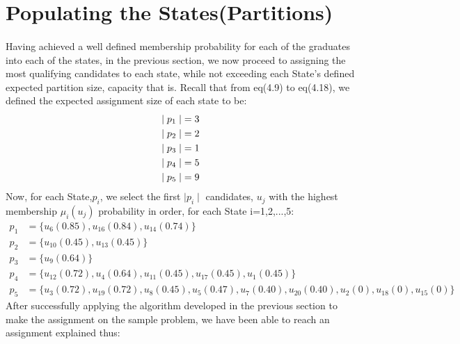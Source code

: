 \documentclass[a4paper,openany]{book}
\begin{document}
		\section{Populating the States(Partitions)}
			\paragraph{}
				Having achieved a well defined membership probability for each of the graduates into each of the states, in the previous section, we now proceed to assigning the most qualifying candidates to each state, while not exceeding each State's defined expected partition size, capacity that is.
				Recall that from eq(4.9) to eq(4.18), we defined the expected assignment size of each state to be:
				\begin{align}
					\mid p_1 \mid &= 3 \notag \\
					\mid p_2 \mid &= 2 \notag \\
					\mid p_3 \mid &= 1 \notag \\
					\mid p_4 \mid &= 5 \notag \\
					\mid p_5 \mid &= 9 \notag
				\end{align}
				Now, for each State,$p_i$, we select the first $\mid p_i \mid$ candidates, $u_j$ with the highest membership $\mu_i(u_j)$ probability in order, for each State i=1,2,...,5:
				\begin{align}
					p_1 &= \{u_6(0.85), u_{16}(0.84), u_{14}(0.74)\}\\
					p_2 &= \{u_{10}(0.45), u_{13}(0.45)\}\\
					p_3 &= \{u_{9}(0.64)\}\\
					p_4 &= \{u_{12}(0.72),u_{4}(0.64),u_{11}(0.45),u_{17}(0.45),u_{1}(0.45)\}\\
					p_5 &= \{u_{3}(0.72),u_{19}(0.72),u_{8}(0.45),u_{5}(0.47),u_{7}(0.40),u_{20}(0.40),u_{2}(0),u_{18}(0),u_{15}(0)\}
				\end{align}
				After successfully applying the algorithm developed in the previous section to make the assignment on the sample problem, we have been able to reach an assignment explained thus:
\end{document}
